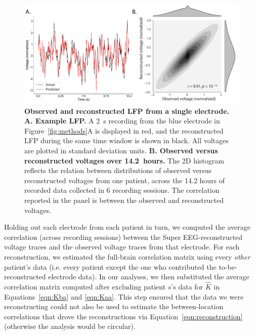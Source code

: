 \documentclass[11pt]{article}
\begin{document}
\begin{figure}
  \centering
  \includegraphics[width=\textwidth]{figs/recon}
  \caption{\textbf{Observed and reconstructed LFP from a single
      electrode.} \textbf{A. Example LFP.}  A 2~s recording from the blue
    electrode in Figure~\ref{fig:methods}A is displayed in red, and
    the reconstructed LFP during the same time window is shown in
   black.  All voltages are plotted in standard deviation units.
    \textbf{B. Observed versus reconstructed voltages over 14.2~hours.}
    The 2D histogram reflects the relation between distributions of
    observed versus reconstructed voltages from one patient, across the
    14.2 hours of recorded data collected in 6 recording sessions.  The
    correlation reported in the panel is between the observed and reconstructed
    voltages.}
  \label{fig:recon}
\end{figure}

Holding out each electrode from each patient in turn, we computed the
average correlation (across recording sessions) between the Super
EEG-reconstructed voltage traces and the observed voltage traces from
that electrode.  For each reconstruction, we estimated the full-brain
correlation matrix using every \textit{other} patient's data
(i.e. every patient except the one who contributed the
to-be-reconstructed electrode data).  In our analyses, we then
substituted the average correlation matrix computed after excluding
patient $s$'s data for $\hat{K}$ in Equations~\ref{eqn:Kba} and
\ref{eqn:Kaa}.  This step ensured that the data we were reconstructing
could not also be used to estimate the between-location correlations
that drove the reconstructions via Equation~\ref{eqn:reconstruction}
(otherwise the analysis would be circular).
\end{document}
